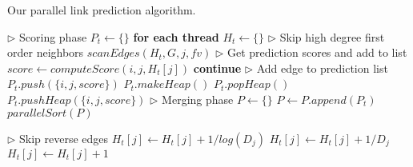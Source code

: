 \begin{algorithm}[hbtp]
\caption{Our parallel link prediction algorithm.}
\label{alg:predict}
\begin{algorithmic}[1]

\Statex

 \label{alg:predict--begin}
  \State $\rhd$ Scoring phase
  \State $P_t \gets \{\}$ \textbf{for each thread}
    \State $H_t \gets \{\}$
    \State $\rhd$ Skip high degree first order neighbors
      \State $scanEdges(H_t, G, j, fv)$
    \EndFor
    \State $\rhd$ Get prediction scores and add to list
      \State $score \gets computeScore(i, j, H_t[j])$
       \textbf{continue}
      \EndIf
      \State $\rhd$ Add edge to prediction list
        \State $P_t.push(\{i, j, score\})$
         $P_t.makeHeap()$
        \EndIf
        \State $P_t.popHeap()$
        \State $P_t.pushHeap(\{i, j, score\})$
      \EndIf
    \EndFor
  \EndFor
  \State $\rhd$ Merging phase
  \State $P \gets \{\}$
    \State $P \gets P.append(P_t)$
  \EndFor
  \State $parallelSort(P)$
\EndFunction \label{alg:predict--end}

\Statex

  \State $\rhd$ Skip reverse edges
     $H_t[j] \gets H_t[j] + 1 / log(D_j)$
     $H_t[j] \gets H_t[j] + 1 / D_j$
    \Else\ $H_t[j] \gets H_t[j] + 1$
    \EndIf
  \EndFor
\EndFunction
\end{algorithmic}
\end{algorithm}

